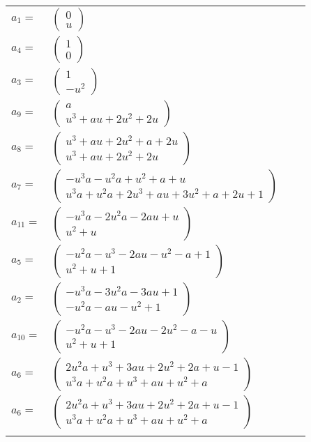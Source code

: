 \documentclass[1p]{elsarticle_modified}
\theoremstyle{definition}
\begin{document}
\begin{tabular}{m{7pt} m{180pt} m{7pt} m{180pt} }
\flushright $a_{1}=$&$\begin{pmatrix}0\\u\end{pmatrix}$ \\
\flushright $a_{4}=$&$\begin{pmatrix}1\\0\end{pmatrix}$ \\
\flushright $a_{3}=$&$\begin{pmatrix}1\\- u^2\end{pmatrix}$ \\
\flushright $a_{9}=$&$\begin{pmatrix}a\\u^3+a u+2 u^2+2 u\end{pmatrix}$ \\
\flushright $a_{8}=$&$\begin{pmatrix}u^3+a u+2 u^2+a+2 u\\u^3+a u+2 u^2+2 u\end{pmatrix}$ \\
\flushright $a_{7}=$&$\begin{pmatrix}- u^3 a- u^2 a+u^2+a+u\\u^3 a+u^2 a+2 u^3+a u+3 u^2+a+2 u+1\end{pmatrix}$ \\
\flushright $a_{11}=$&$\begin{pmatrix}- u^3 a-2 u^2 a-2 a u+u\\u^2+u\end{pmatrix}$ \\
\flushright $a_{5}=$&$\begin{pmatrix}- u^2 a- u^3-2 a u- u^2- a+1\\u^2+u+1\end{pmatrix}$ \\
\flushright $a_{2}=$&$\begin{pmatrix}- u^3 a-3 u^2 a-3 a u+1\\- u^2 a- a u- u^2+1\end{pmatrix}$ \\
\flushright $a_{10}=$&$\begin{pmatrix}- u^2 a- u^3-2 a u-2 u^2- a- u\\u^2+u+1\end{pmatrix}$ \\
\flushright $a_{6}=$&$\begin{pmatrix}2 u^2 a+u^3+3 a u+2 u^2+2 a+u-1\\u^3 a+u^2 a+u^3+a u+u^2+a\end{pmatrix}$\\ \flushright $a_{6}=$&$\begin{pmatrix}2 u^2 a+u^3+3 a u+2 u^2+2 a+u-1\\u^3 a+u^2 a+u^3+a u+u^2+a\end{pmatrix}$\\&\end{tabular}
\end{document}
